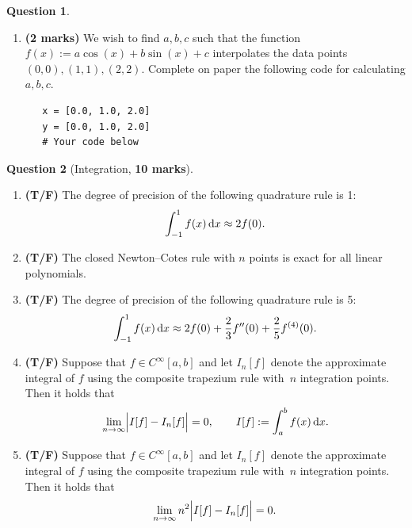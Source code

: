 \documentclass[10pt]{article}
\theoremstyle{definition}
\newtheorem{question}{Question}
\theoremstyle{remark}
\theoremstyle{plain}%
\begin{document}
\begin{question}
\begin{enumerate}
        \item
            \textbf{(2 marks)}
            We wish to find $a, b, c$ such that the function $f(x) := a \cos(x) + b \sin(x) + c$ 
            interpolates the data points $(0, 0), (1, 1), (2, 2)$.
            Complete on paper the following code for calculating $a, b, c$.
            \begin{verbatim}
   x = [0.0, 1.0, 2.0]
   y = [0.0, 1.0, 2.0]
   # Your code below
            \end{verbatim}
    \end{enumerate}
\end{question}

\newpage
\begin{question}
    [Integration, \textbf{10 marks}]
    $~$
    \begin{enumerate}
        \item
            \textbf{(T/F)}
            The degree of precision of the following quadrature rule is 1:
            \[
                \int_{-1}^{1} f(x) \, \mathrm d x
                \approx 2 f(0).
            \]

        \item
            \textbf{(T/F)}
            The closed Newton--Cotes rule with $n$ points is exact for all linear polynomials.

        \item
            \textbf{(T/F)}
            The degree of precision of the following quadrature rule is 5:
            \[
                \int_{-1}^1 f(x) \, \mathrm d x \approx 2f(0) + \frac{2}{3} f''(0) + \frac{2}{5} f^{(4)}(0).
            \]

        \item
            \textbf{(T/F)}
            Suppose that $f \in C^{\infty}[a, b]$ and let $I_n[f]$ denote the approximate integral of $f$ using the composite trapezium rule
            with~$n$ integration points.
            Then it holds that
            \[
                \lim_{n \to \infty} \Bigl\lvert I[f] - I_n[f] \Bigr\rvert = 0, \qquad I[f] := \int_{a}^{b} f(x) \, \mathrm d x.
            \]

        \item
            \textbf{(T/F)}
            Suppose that $f \in C^{\infty}[a, b]$ and let $I_n[f]$ denote the approximate integral of $f$ using the composite trapezium rule
            with~$n$ integration points.
            Then it holds that
            \[
                \lim_{n \to \infty} n^2 \Bigl\lvert I[f] - I_n[f] \Bigr\rvert = 0.
            \]


\end{enumerate}
\end{question}
\end{document}
